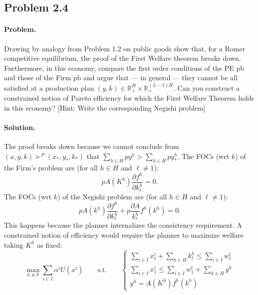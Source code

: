 \subsection{Problem 2.4}
\paragraph{Problem.} Drawing by analogy from Problem 1.2 on public goods show that, for a Romer competitive equilibrium, the proof of the First Welfare theorem breaks down. Furthermore, in this economy, compare the first order conditions of the PE pb and those of the Firm pb and argue that --- in general --- they cannot be all satisfied at a production plan $(y, k) \in \mathbb{R}_+^H \times \mathbb{R}_+^{(L-1)H}$. Can you construct a constrained notion of Pareto efficiency for which the First Welfare Theorem holds in this economy? [Hint: Write the corresponding Negishi problem]

\paragraph{Solution.}
The proof breaks down because we cannot conclude from $(x, y, k) \succ^P (x_*, y_*, k_*)$ that $\sum_{h \in H} p y^h > \sum_{h \in H} p y_*^h$. The FOCs (wrt $k$) of the Firm's problem are (for all $h \in H$ and $\ell \neq 1$):
\[
p A(K^h) \frac{\partial f^h}{\partial k_\ell^h} = 0.
\]
The FOCs (wrt $k$) of the Negishi problem are (for all $h \in H$ and $\ell \neq 1$):
\[
p A(k^h) \frac{\partial f^h}{\partial k_\ell^h} + p \frac{\partial A}{k_\ell^h} f^h(k^h) = 0.
\]
This happens because the planner internalizes the consistency requirement. A constrained notion of efficiency would require the planner to maximize welfare taking $K^h$ as fixed:
\[
\max_{x, y, k} \sum_{i \in I} \alpha^i U(x^i) \qquad \text{s.t.} \qquad
\begin{cases}
\sum_{i \in I} x_\ell^i + \sum_{h \in H} k_\ell^h \leq \sum_{i \in I} w_\ell^i \\
\sum_{i \in I} x_1^i \leq \sum_{i \in I} w_1^i + \sum_{h \in H} y^h \\
y^h = A(K^h) f^h(k^h)
\end{cases}
\]
